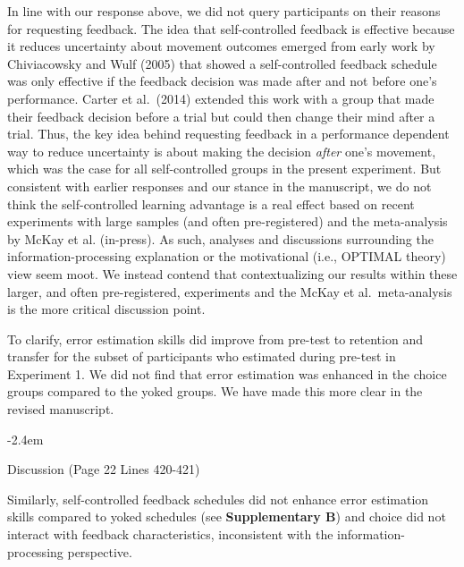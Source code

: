 \documentclass[final]{article}
\renewenvironment{quote}{\begin{fquote}\advance\leftmargini -2.4em\begin{oldquote}}{\end{oldquote}\end{fquote}}
\newenvironment{fquote}
  {\def\FrameCommand{
	\fboxsep=0.6em %
	\fcolorbox{black}{white}}%
    \MakeFramed {\advance\hsize-2\width \FrameRestore}
    \begin{minipage}{\linewidth}
  }
  {\end{minipage}\endMakeFramed}
\newcommand{\TaskEstimationBox}[2]{%
\ifoptiondraft{\parbox{1.0\linewidth}{\hfill \hfill {\colorbox{#2}{\color{White} \textbf{#1}}}}}%
{}%
}
\def\Done {\TaskEstimationBox{Done}{Blue}}
\begin{document}
In line with our response above, we did not query participants on their reasons for requesting feedback. The idea that self-controlled feedback is effective because it reduces uncertainty about movement outcomes emerged from early work by Chiviacowsky and Wulf (2005) that showed a self-controlled feedback schedule was only effective if the feedback decision was made after and not before one's performance. Carter et al.~(2014) extended this work with a group that made their feedback decision before a trial but could then change their mind after a trial. Thus, the key idea behind requesting feedback in a performance dependent way to reduce uncertainty is about making the decision \emph{after} one's movement, which was the case for all self-controlled groups in the present experiment. But consistent with earlier responses and our stance in the manuscript, we do not think the self-controlled learning advantage is a real effect based on recent experiments with large samples (and often pre-registered) and the meta-analysis by McKay et al. (in-press). As such, analyses and discussions surrounding the information-processing explanation or the motivational (i.e., OPTIMAL theory) view seem moot. We instead contend that contextualizing our results within these larger, and often pre-registered, experiments and the McKay et al.~meta-analysis is the more critical discussion point.

\Done


To clarify, error estimation skills did improve from pre-test to retention and transfer for the subset of participants who estimated during pre-test in Experiment 1. We did not find that error estimation was enhanced in the choice groups compared to the yoked groups. We have made this more clear in the revised manuscript.

\begin{quote}
Discussion (Page 22 Lines 420-421)

Similarly, self-controlled feedback schedules did not enhance error estimation skills compared to yoked schedules (see \textbf{Supplementary B}) and choice did not interact with feedback characteristics, inconsistent with the information-processing perspective.
\end{quote}
\end{document}
